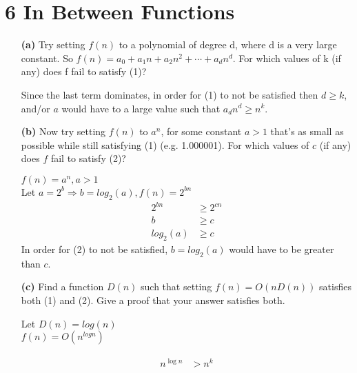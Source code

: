 \documentclass[12pt]{article}
\begin{document}
    \section*{6 In Between Functions}
    \begin{enumerate}
        \item[\textbf{(a)}] Try setting $f(n)$ to a polynomial of degree d, where d is a very large constant. So
        $f(n) = a_0 + a_1n + a_2n^2 + \cdots + a_dn^d$. For which values of k (if any) does f fail to satisfy (1)?\\
        \color{blue}
        \begin{center}
            Since the last term dominates, in order for (1) to not be satisfied then $d\ge k$, and/or $a$ would have to a large value such that $a_dn^d \ge n^k$.
        \end{center}
        \color{black}
        \item[\textbf{(b)}] Now try setting $f(n)$ to $a^n$, for some constant $a > 1$ that’s as small as possible while
        still satisfying (1) (e.g. 1.000001). For which values of $c$ (if any) does $f$ fail to satisfy (2)?
        \color{blue}
            \begin{center}
                $f(n) = a^n, a > 1$ \\
                Let $a = 2^b \Rightarrow b = log_2(a), f(n) = 2^{bn}$
                \begin{align*}
                    2^{bn} &\ge 2^{cn} \\
                    b &\ge c \\
                    log_2(a) &\ge c
                \end{align*}
                In order for (2) to not be satisfied, $b=log_2(a)$ would have to be greater than $c$.
            \end{center}
        \color{black}
        \item[\textbf{(c)}] Find a function $D(n)$ such that setting $f(n) = O(nD(n))$ satisfies both (1) and (2). Give   
        a proof that your answer satisfies both.\\
        \color{blue}
        \begin{center}
            Let $D(n) = log(n)$ \\
            $f(n) = O(n^{log n})$ 
        \end{center}
        \begin{align*}
            \begin{split}
                n^{\log n} &> n^k\\

\end{split}
\end{align*}
\end{enumerate}
\end{document}
